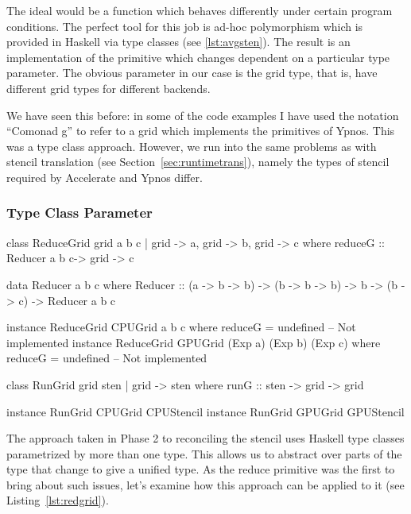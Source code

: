\documentclass[
    12pt,
    a4paper,
    twoside,
    openright,
    ]{scrbook}
\begin{document}
The ideal would be a function which behaves differently under certain program
conditions. The perfect tool for this job is ad-hoc polymorphism which is
provided in Haskell via type classes (see \autoref{lst:avgsten}). The result is
an implementation of the primitive which changes dependent on a particular type
parameter. The obvious parameter in our case is the grid type, that is, have
different grid types for different backends.

We have seen this before: in some of the code examples I have used the notation
``Comonad g'' to refer to a grid which implements the primitives of Ypnos. This
was a type class approach. However, we run into the same problems as with
stencil translation (see Section~\ref{sec:runtimetrans}), namely the types of
stencil required by Accelerate and Ypnos differ.

\subsubsection{Type Class Parameter}

\begin{hflisting}[label={lst:redgrid}, caption={The \texttt{ReduceGrid} type
class defined with type parameters for each variable: \texttt{a}, \texttt{b} and
\texttt{c}. The \texttt{RunGrid} type class has type parameter \texttt{grid} and
\texttt{sten} where the later is fully determined by the former.}]
class ReduceGrid grid a b c | grid -> a,
                              grid -> b,
                              grid -> c where
    reduceG :: Reducer a b c-> grid -> c

data Reducer a b c where
    Reducer ::   (a -> b -> b)
              -> (b -> b -> b)
              -> b
              -> (b -> c)
              -> Reducer a b c

instance ReduceGrid CPUGrid a b c where
    reduceG = undefined -- Not implemented
instance ReduceGrid GPUGrid (Exp a) (Exp b) (Exp c) where
    reduceG = undefined -- Not implemented

class RunGrid grid sten | grid -> sten where
    runG :: sten -> grid -> grid

instance RunGrid CPUGrid CPUStencil
instance RunGrid GPUGrid GPUStencil
\end{hflisting}

The approach taken in Phase 2 to reconciling the stencil uses Haskell type
classes parametrized by more than one type. This allows us to abstract over
parts of the type that change to give a unified type. As the reduce primitive
was the first to bring about such issues, let's examine how this approach can be
applied to it (see Listing~\ref{lst:redgrid}).
\end{document}
